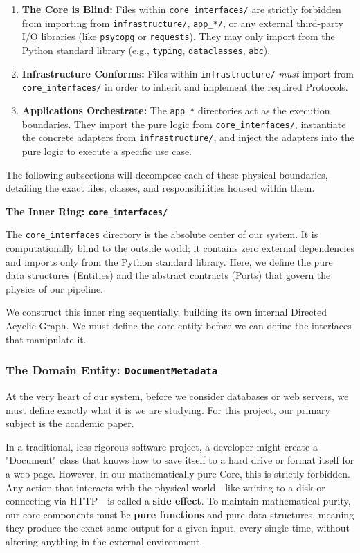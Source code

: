 \begin{enumerate}
    \item \textbf{The Core is Blind:} Files within \texttt{core\_interfaces/} are strictly forbidden from importing from \texttt{infrastructure/}, \texttt{app\_*/}, or any external third-party I/O libraries (like \texttt{psycopg} or \texttt{requests}). They may only import from the Python standard library (e.g., \texttt{typing}, \texttt{dataclasses}, \texttt{abc}).
    \item \textbf{Infrastructure Conforms:} Files within \texttt{infrastructure/} \textit{must} import from \texttt{core\_interfaces/} in order to inherit and implement the required Protocols.
    \item \textbf{Applications Orchestrate:} The \texttt{app\_*} directories act as the execution boundaries. They import the pure logic from \texttt{core\_interfaces/}, instantiate the concrete adapters from \texttt{infrastructure/}, and inject the adapters into the pure logic to execute a specific use case.
\end{enumerate}

The following subsections will decompose each of these physical boundaries, detailing the exact files, classes, and responsibilities housed within them.


\textbf{The Inner Ring: \texttt{core\_interfaces/}}

The \texttt{core\_interfaces} directory is the absolute center of our system. It is computationally blind to the outside world; it contains zero external dependencies and imports only from the Python standard library. Here, we define the pure data structures (Entities) and the abstract contracts (Ports) that govern the physics of our pipeline.

We construct this inner ring sequentially, building its own internal Directed Acyclic Graph. We must define the core entity before we can define the interfaces that manipulate it.


\subsubsection*{The Domain Entity: \texttt{DocumentMetadata}}

At the very heart of our system, before we consider databases or web servers, we must define exactly what it is we are studying. For this project, our primary subject is the academic paper.

In a traditional, less rigorous software project, a developer might create a "Document" class that knows how to save itself to a hard drive or format itself for a web page. However, in our mathematically pure Core, this is strictly forbidden. Any action that interacts with the physical world—like writing to a disk or connecting via HTTP—is called a \textbf{side effect}. To maintain mathematical purity, our core components must be \textbf{pure functions} and pure data structures, meaning they produce the exact same output for a given input, every single time, without altering anything in the external environment.

